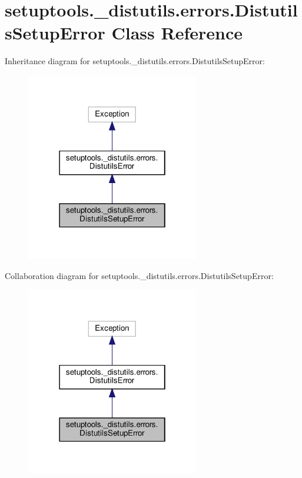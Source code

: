 \hypertarget{classsetuptools_1_1__distutils_1_1errors_1_1DistutilsSetupError}{}\section{setuptools.\+\_\+distutils.\+errors.\+Distutils\+Setup\+Error Class Reference}
\label{classsetuptools_1_1__distutils_1_1errors_1_1DistutilsSetupError}


Inheritance diagram for setuptools.\+\_\+distutils.\+errors.\+Distutils\+Setup\+Error\+:
\nopagebreak
\begin{figure}[H]
\begin{center}
\leavevmode
\includegraphics[width=214pt]{classsetuptools_1_1__distutils_1_1errors_1_1DistutilsSetupError__inherit__graph}
\end{center}
\end{figure}


Collaboration diagram for setuptools.\+\_\+distutils.\+errors.\+Distutils\+Setup\+Error\+:
\nopagebreak
\begin{figure}[H]
\begin{center}
\leavevmode
\includegraphics[width=214pt]{classsetuptools_1_1__distutils_1_1errors_1_1DistutilsSetupError__coll__graph}
\end{center}
\end{figure}


